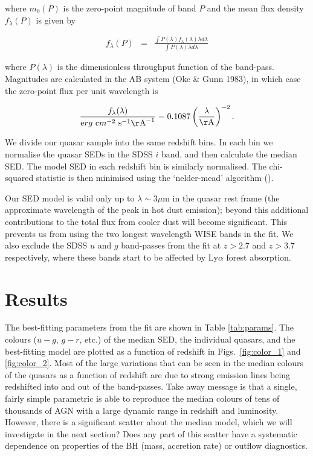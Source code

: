 where $m_0(P)$ is the zero-point magnitude of band $P$ and the mean flux density $f_{\lambda}(P)$ is given by 

\begin{eqnarray}
  \label{eq:flux}
  f_{\lambda}(P) & = & \frac{\int P(\lambda) f_\lambda(\lambda) \lambda d\lambda }{\int P(\lambda) \lambda d\lambda}
\end{eqnarray}

where $P(\lambda)$ is the dimensionless throughput function of the band-pass. 
Magnitudes are calculated in the AB system (Oke \& Gunn 1983), in which case the zero-point flux per unit wavelength is 

\begin{eqnarray}
  \frac{f_\lambda(\lambda)}{{\mathrm erg}~{\mathrm cm}^{-2}~{\mathrm s}^{-1} {\mathrm\AA}^{-1}} = 0.1087 \left(\frac{\lambda}{\mathrm \AA}\right)^{-2}.
\end{eqnarray}


We divide our quasar sample into the same redshift bins.
In each bin we normalise the quasar SEDs in the SDSS $i$ band, and then calculate the median SED. 
The model SED in each redshift bin is similarly normalised. 
The chi-squared statistic is then minimised using the `nelder-mead' algorithm (). 

Our SED model is valid only up to $\lambda \sim 3\mu$m in the quasar rest frame (the approximate wavelength of the peak in hot dust emission); beyond this additional contributions to the total flux from cooler dust will become significant. 
This prevents us from using the two longest wavelength WISE bands in the fit. 
We also exclude the SDSS $u$ and $g$ band-passes from the fit at $z > 2.7$ and $z > 3.7$ respectively, where these bands start to be affected by Ly$\alpha$ forest absorption.

\section{Results}

The best-fitting parameters from the fit are shown in Table \ref{tab:params}. 
The colours ($u - g$, $g - r$, etc.) of the median SED, the individual quasars, and the best-fitting model are plotted as a function of redshift in Figs.~\ref{fig:color_1} and \ref{fig:color_2}.
Most of the large variations that can be seen in the median colours of the quasars as a function of redshift are due to strong emission lines being redshifted into and out of the band-passes.
Take away message is that a single, fairly simple parametric is able to reproduce the median colours of tens of thousands of AGN with a large dynamic range in redshift and luminosity. 
However, there is a significant scatter about the median model, which we will investigate in the next section?
Does any part of this scatter have a systematic dependence on properties of the BH (mass, accretion rate) or outflow diagnostics.  

